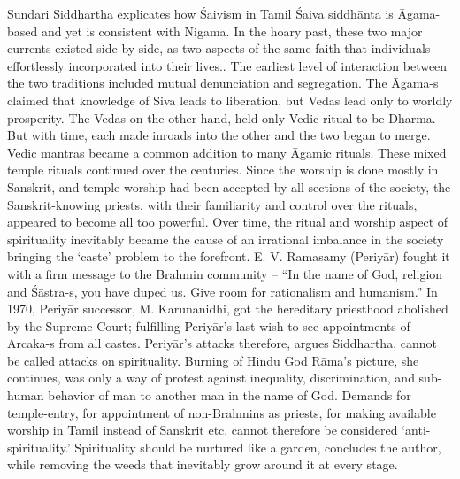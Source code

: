 Sundari Siddhartha explicates how Śaivism in Tamil Śaiva siddhānta is Āgama-based and yet is consistent with Nigama. In the hoary past, these two major currents existed side by side, as two aspects of the same faith that individuals effortlessly incorporated into their lives.. The earliest level of interaction between the two traditions included mutual denunciation and segregation. The Āgama-s claimed that knowledge of Siva leads to liberation, but Vedas lead only to worldly prosperity. The Vedas on the other hand, held only Vedic ritual to be Dharma. But with time, each made inroads into the other and the two began to merge. Vedic mantras became a common addition to many Āgamic rituals. These mixed temple rituals continued over the centuries. Since the worship is done mostly in Sanskrit, and temple-worship had been accepted by all sections of the society, the Sanskrit-knowing priests, with their familiarity and control over the rituals, appeared to become all too powerful. Over time, the ritual and worship aspect of spirituality inevitably became the cause of an irrational imbalance in the society bringing the ‘caste’ problem to the forefront. E. V. Ramasamy (Periyār) fought it with a firm message to the Brahmin community – “In the name of God, religion and Śāstra-s, you have duped us. Give room for rationalism and humanism.” In 1970, Periyār successor, M. Karunanidhi, got the hereditary priesthood abolished by the Supreme Court; fulfilling Periyār’s last wish to see appointments of Arcaka-s from all castes. Periyār’s attacks therefore, argues Siddhartha, cannot be called attacks on spirituality. Burning of Hindu God Rāma’s picture, she continues, was only a way of protest against inequality, discrimination, and sub-human behavior of man to another man in the name of God. Demands for temple-entry, for appointment of non-Brahmins as priests, for making available worship in Tamil instead of Sanskrit etc. cannot therefore be considered ‘anti-spirituality.’ Spirituality should be nurtured like a garden, concludes the author, while removing the weeds that inevitably grow around it at every stage. 

